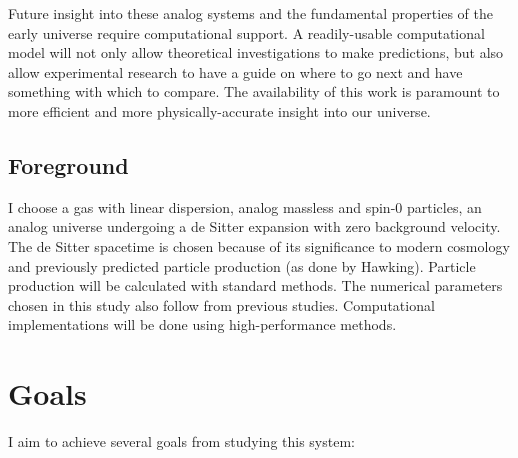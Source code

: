 \documentclass{article}
\begin{document}
            Future insight into these analog systems and the fundamental properties of the early universe require computational support.  A readily-usable computational model will not only allow theoretical investigations to make predictions, but also allow experimental research to have a guide on where to go next and have something with which to compare.  The availability of this work is paramount to more efficient and more physically-accurate insight into our universe.

        \subsection{Foreground} \label{sec:Foreground}
            
            I choose a gas with linear dispersion, analog massless and spin-0 particles, an analog universe undergoing a de Sitter expansion with zero background velocity.  The de Sitter spacetime is chosen because of its significance to modern cosmology and previously predicted particle production (as done by Hawking)\cite{de_Sitter_inhomogeneities, de_Sitter_particle_production_1, de_Sitter_particle_production_2}. Particle production will be calculated with standard methods\cite{particle_production_1, particle_production_2}.  The numerical parameters chosen in this study also follow from previous studies\cite{parameters}.  Computational implementations will be done using high-performance methods.
\pagebreak
    \section{Goals} \label{sec:Goals}

        I aim to achieve several goals from studying this system: 
        
\end{document}
